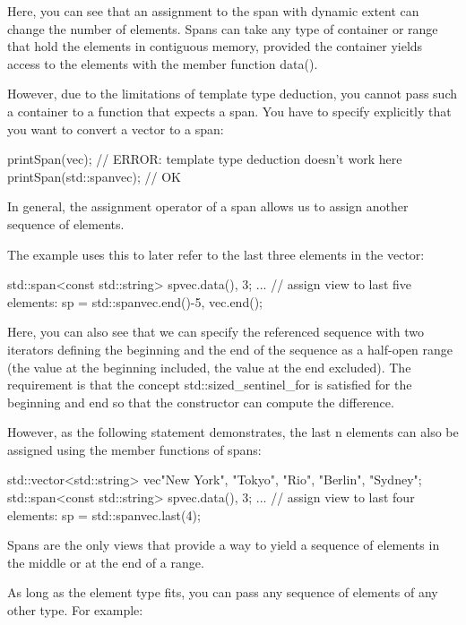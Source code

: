 Here, you can see that an assignment to the span with dynamic extent can change the number of elements. Spans can take any type of container or range that hold the elements in contiguous memory, provided the container yields access to the elements with the member function data().

However, due to the limitations of template type deduction, you cannot pass such a container to a function that expects a span. You have to specify explicitly that you want to convert a vector to a span:

\begin{cpp}
printSpan(vec); // ERROR: template type deduction doesn’t work here
printSpan(std::span{vec}); // OK
\end{cpp}


In general, the assignment operator of a span allows us to assign another sequence of elements.

The example uses this to later refer to the last three elements in the vector:

\begin{cpp}
std::span<const std::string> sp{vec.data(), 3};
...
// assign view to last five elements:
sp = std::span{vec.end()-5, vec.end()};
\end{cpp}

Here, you can also see that we can specify the referenced sequence with two iterators defining the beginning and the end of the sequence as a half-open range (the value at the beginning included, the value at the end excluded). The requirement is that the concept std::sized\_sentinel\_for is satisfied for the beginning and end so that the constructor can compute the difference.

However, as the following statement demonstrates, the last n elements can also be assigned using the member functions of spans:

\begin{cpp}
std::vector<std::string> vec{"New York", "Tokyo", "Rio", "Berlin", "Sydney"};
std::span<const std::string> sp{vec.data(), 3};
...
// assign view to last four elements:
sp = std::span{vec}.last(4);
\end{cpp}

Spans are the only views that provide a way to yield a sequence of elements in the middle or at the end of a range.

As long as the element type fits, you can pass any sequence of elements of any other type. For example:

